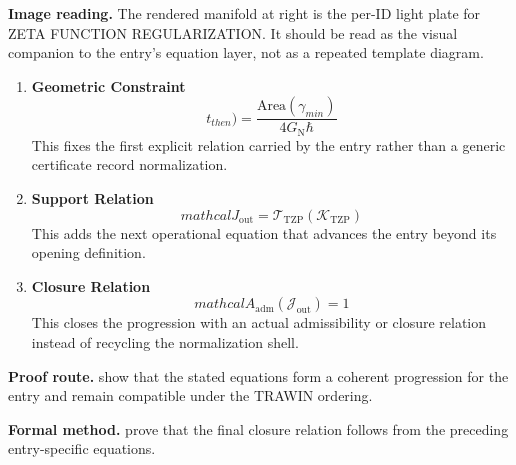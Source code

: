 \begin{samepage}
\noindent\begin{minipage}[t]{0.45\linewidth}
\vspace{0pt}
\raggedright
\scriptsize\textbf{Image reading.} The rendered manifold at right is the per-ID light plate for ZETA FUNCTION REGULARIZATION. It should be read as the visual companion to the entry's equation layer, not as a repeated template diagram.\par
\end{minipage}\hfill
\begin{minipage}[t]{0.53\linewidth}
\vspace*{-0.10in}
\raggedright
{}
\end{minipage}
\end{samepage}

\clearpage


\begin{enumerate}[leftmargin=1.6em,itemsep=9pt,topsep=6pt]
\item \textbf{Geometric Constraint}
\[
t_{then}) = \frac{\text{Area}(\gamma_{min})}{4 G_{\mathrm{N}} \hbar}
\]
This fixes the first explicit relation carried by the entry rather than a generic certificate record normalization.

\item \textbf{Support Relation}
\[
mathcal{J}_{\mathrm{out}} = \mathcal{T}_{\mathrm{TZP}}\!\left(\mathcal{K}_{\mathrm{TZP}}\right)
\]
This adds the next operational equation that advances the entry beyond its opening definition.

\item \textbf{Closure Relation}
\[
mathcal{A}_{\mathrm{adm}}\!\left(\mathcal{J}_{\mathrm{out}}\right)=1
\]
This closes the progression with an actual admissibility or closure relation instead of recycling the normalization shell.
\end{enumerate}

\textbf{Proof route.} show that the stated equations form a coherent progression for the entry and remain compatible under the TRAWIN ordering.

\textbf{Formal method.} prove that the final closure relation follows from the preceding entry-specific equations.

\medskip
{}

